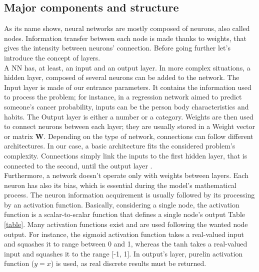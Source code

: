\documentclass[11pt, a4paper, English]{report}
\begin{document}
\begin{appendix}
\section{Major components and structure}
As its name shows, neural networks are mostly composed of neurons, also called nodes. Information transfer between each node is made thanks to weights, that gives the intensity between neurons' connection. Before going further let's introduce the concept of layers.\\
A NN has, at least, an input and an output layer. In more complex situations, a hidden layer, composed of several neurons can be added to the network. The Input layer is made of our entrance parameters. It contains the information used to process the problem; for instance, in a regression network aimed to predict someone's cancer probability, inputs can be the person body characteristics and habits. The Output layer is either a number or a category. Weights are then used to connect neurons between each layer; they are usually stored in a Weight vector or matrix \textbf{W}. Depending on the type of network, connections can follow different architectures. In our case, a basic architecture fits the considered problem's complexity. Connections simply link the inputs to the first hidden layer, that is connected to the second, until the output layer \cite{Kriesel}. \\
Furthermore, a network doesn't operate only with weights between layers. Each neuron has also its bias, which is essential during the model's mathematical process. The neuron information acquirement is usually followed by its processing by an activation function. Basically, considering a single node, the activation function is a scalar-to-scalar function that defines a single node's output Table \ref{table}. Many activation functions exist and are used following the  wanted node output. For instance, the sigmoid activation function takes a real-valued input and squashes it to range between 0 and 1, whereas the tanh takes a real-valued input and squashes it to the range [-1, 1]. In output's layer, purelin activation function ($y=x$) is used, as real discrete results must be returned.  


\end{appendix}
\end{document}
